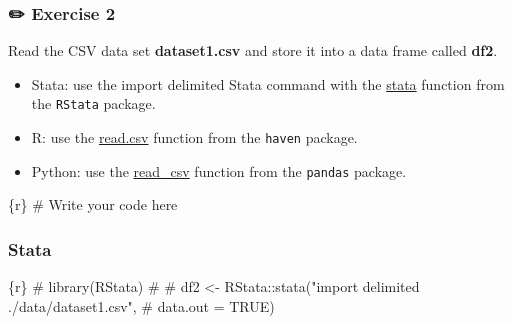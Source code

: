 \documentclass[
  letterpaper,
  DIV=11,
  numbers=noendperiod]{scrreprt}
\newenvironment{Shaded}{\begin{snugshade}}{\end{snugshade}}
\newcommand{\CommentTok}[1]{\textcolor[rgb]{0.37,0.37,0.37}{#1}}
\newcommand{\InformationTok}[1]{\textcolor[rgb]{0.37,0.37,0.37}{#1}}
\providecommand{\tightlist}{%
  \setlength{\itemsep}{0pt}\setlength{\parskip}{0pt}}\usepackage{longtable,booktabs,array}
\begin{document}
\hypertarget{exercise-2}{%
\subsubsection{\texorpdfstring{{✏️} Exercise
2}{✏️ Exercise 2}}\label{exercise-2}}

Read the CSV data set \textbf{dataset1.csv} and store it into a data
frame called \textbf{df2}.

\begin{tcolorbox}[enhanced jigsaw, colframe=quarto-callout-tip-color-frame, colback=white, rightrule=.15mm, bottomrule=.15mm, left=2mm, arc=.35mm, coltitle=black, title=\textcolor{quarto-callout-tip-color}{\faLightbulb}\hspace{0.5em}{Tip}, opacitybacktitle=0.6, bottomtitle=1mm, opacityback=0, toptitle=1mm, toprule=.15mm, colbacktitle=quarto-callout-tip-color!10!white, titlerule=0mm, leftrule=.75mm, breakable]

\begin{itemize}
\tightlist
\item
  Stata: use the import delimited Stata command with the
  \href{https://rdrr.io/github/lbraglia/RStata/man/stata.html}{stata}
  function from the \texttt{RStata} package.
\item
  R: use the
  \href{https://www.rdocumentation.org/packages/utils/versions/3.6.2/topics/read.table}{read.csv}
  function from the \texttt{haven} package.
\item
  Python: use the
  \href{https://pandas.pydata.org/docs/reference/api/pandas.read_csv.html}{read\_csv}
  function from the \texttt{pandas} package.
\end{itemize}

\end{tcolorbox}

\begin{Shaded}
\begin{Highlighting}[]
\InformationTok{\textasciigrave{}\textasciigrave{}\textasciigrave{}\{r\}}
\CommentTok{\# Write your code here}
\InformationTok{\textasciigrave{}\textasciigrave{}\textasciigrave{}}
\end{Highlighting}
\end{Shaded}

\hypertarget{stata-1}{%
\subsubsection{Stata}\label{stata-1}}

\begin{Shaded}
\begin{Highlighting}[]
\InformationTok{\textasciigrave{}\textasciigrave{}\textasciigrave{}\{r\}}
\CommentTok{\# library(RStata)}
\CommentTok{\# }
\CommentTok{\# df2 \textless{}{-} RStata::stata("import delimited ./data/dataset1.csv",}
\CommentTok{\#                      data.out = TRUE)}
\InformationTok{\textasciigrave{}\textasciigrave{}\textasciigrave{}}
\end{Highlighting}
\end{Shaded}
\end{document}

